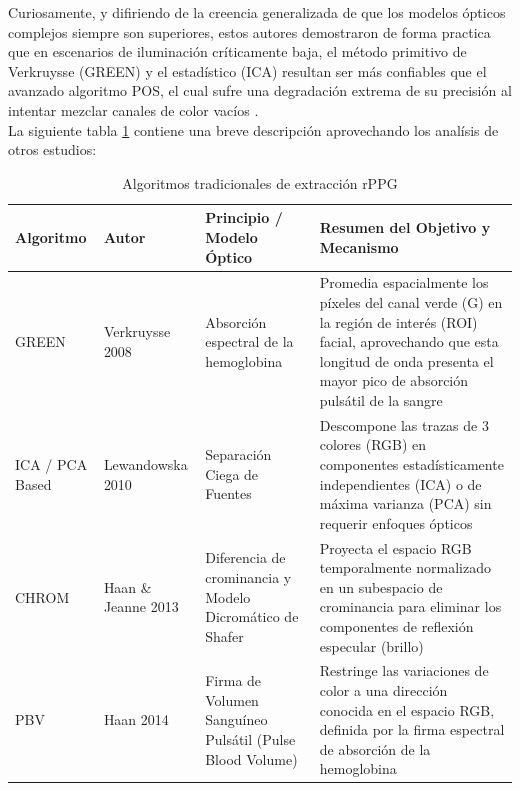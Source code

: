 Curiosamente, y difiriendo de la creencia generalizada de que los modelos ópticos complejos siempre son superiores, estos autores demostraron de forma practica que 
en escenarios de iluminación críticamente baja, el método primitivo de Verkruysse (GREEN) y el estadístico (ICA) resultan ser más confiables que el avanzado 
algoritmo POS, el cual sufre una degradación extrema de su precisión al intentar mezclar canales de color vacíos \cite{yang2022image_en, yang2022assessment_dl, xi2022weighted}.\\

La siguiente tabla \ref{tab:algoritmos_tradicionales_rppg} contiene una breve descripción aprovechando los analísis de otros estudios:


\begin{table}[htbp]
    \centering
    \caption{Algoritmos tradicionales de extracción rPPG}
    \label{tab:algoritmos_tradicionales_rppg}
    \begin{tabular}{|p{2.5cm}|p{2.3cm}|p{3.2cm}|p{4.8cm}|}
        \hline
        \textbf{Algoritmo} & \textbf{Autor} & \textbf{Principio / Modelo Óptico}    & \textbf{Resumen del Objetivo y Mecanismo} \\ \hline
        GREEN              &  Verkruysse 2008   & Absorción espectral de la hemoglobina & Promedia espacialmente los píxeles del canal verde (G) en la región de interés (ROI) facial, aprovechando que esta longitud de onda presenta el mayor pico de absorción pulsátil de la sangre \cite{yang2022image_en, zhan2026hrv_long, debnath2026advanced_signal}  \\ \hline
        ICA / PCA Based    &  Lewandowska 2010  & Separación Ciega de Fuentes &  Descompone las trazas de 3 colores (RGB) en componentes estadísticamente independientes (ICA) o de máxima varianza (PCA) sin requerir enfoques ópticos \cite{yang2022image_en, transphys2023, debnath2026advanced_signal}  \\ \hline
        CHROM              &  Haan \& Jeanne 2013 & Diferencia de crominancia y Modelo Dicromático de Shafer & Proyecta el espacio RGB temporalmente normalizado en un subespacio de crominancia para eliminar los componentes de reflexión especular (brillo) \cite{nguyen2024artifact_resilience, debnath2026advanced_signal} \\ \hline
        PBV                &  Haan 2014         & Firma de Volumen Sanguíneo Pulsátil (Pulse Blood Volume) & Restringe las variaciones de color a una dirección conocida en el espacio RGB, definida por la firma espectral de absorción de la hemoglobina \cite{xu2023ivrrppg, liang2023selfadaptive} \\ \hline

\end{tabular}
\end{table}
